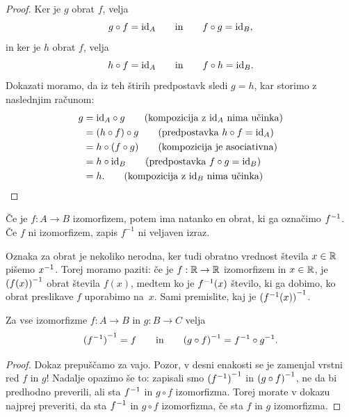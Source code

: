 \begin{proof}
  Ker je $g$ obrat $f$, velja
  \begin{equation*}
    g \circ f = \id[A]
    \qquad\text{in}\qquad
    f \circ g = \id[B],
  \end{equation*}
  in ker je $h$ obrat $f$, velja
  \begin{equation*}
    h \circ f = \id[A]
    \qquad\text{in}\qquad
    f \circ h = \id[B].
  \end{equation*}
  Dokazati moramo, da iz teh štirih predpostavk sledi $g = h$, kar storimo z naslednjim
  računom:
  \begin{align*}
    g
    &= \id[A] \circ g \tag{kompozicija z $\id[A]$ nima učinka} \\
    &= (h \circ f) \circ g \tag{predpostavka $h \circ f = \id[A]$} \\
    &= h \circ (f \circ g) \tag{kompozicija je asociativna} \\
    &= h \circ \id[B] \tag{predpostavka $f \circ g = \id[B]$} \\
    &= h. \tag{kompozicija z $\id[B]$ nima učinka}
  \end{align*}
\end{proof}

Če je $f : A \to B$ izomorfizem, potem ima natanko en obrat, ki ga označimo $\inv{f}$. Če
$f$ ni izomorfizem, zapis $f^{-1}$ ni veljaven izraz.

Oznaka za obrat je nekoliko nerodna, ker tudi obratno vrednost števila $x \in \RR$ pišemo $\inv{x}$.
Torej moramo paziti: če je $f : \RR \to \RR$ izomorfizem in $x \in \RR$, je $\inv{(f(x))}$ obrat števila $f(x)$,
medtem ko je $\inv{f}(x)$ število, ki ga dobimo, ko obrat preslikave $f$ uporabimo na~$x$.
Sami premislite, kaj je $\inv{(\inv{f}(x))}$.

\begin{trditev}
  Za vse izomorfizme $f : A \to B$ in $g : B \to C$ velja
  \begin{equation*}
    \inv{(\inv{f})} = f
    \qquad\text{in}\qquad
    \inv{(g \circ f)} = \inv{f} \circ \inv{g}.
  \end{equation*}
\end{trditev}

\begin{proof}
  Dokaz prepuščamo za vajo. Pozor, v desni enakosti se je zamenjal vrstni red $f$ in $g$!
  Nadalje opazimo še to: zapisali smo $\inv{(\inv{f})}$ in $\inv{(g \circ f)}$, ne da bi
  predhodno preverili, ali sta $\inv{f}$ in $g \circ f$ izomorfizma. Torej morate v dokazu
  najprej preveriti, da sta $\inv{f}$ in $g \circ f$ izomorfizma, če sta $f$ in $g$
  izomorfizma.
\end{proof}

